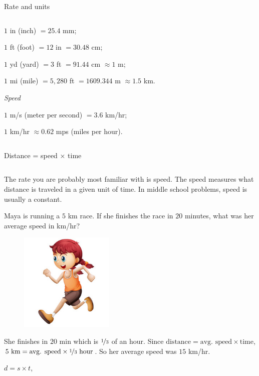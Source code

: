\documentclass[9pt,aspectratio=169]{beamer}
\begin{document}
\begin{frame}{Rate and units}
\begin{columns}[T]
\begin{column}{0.5\textwidth}
      $1$ in (inch) $= 25{.}4$ mm;

      $1$ ft (foot) $= 12$ in $= 30{.}48$ cm;

      $1$ yd (yard) $= 3$ ft $= 91{.}44$ cm $\approx 1$ m;

      $1$ mi (mile) $= 5{,}280$ ft $= 1609{.}344$ m $\approx 1{.}5$ km.\smallskip

      \emph{Speed}

      $1$ m/s (meter per second) $= 3{.}6$ km/hr;

      $1$ km/hr $\approx 0{.}62$ mps (miles per hour).
    \end{column}
  \end{columns}
\end{frame}

\begin{frame}{Distance = speed × time}
  \begin{columns}[T]
    \begin{column}{0.5\textwidth}
      The rate you are probably most familiar with is speed. The speed measures what distance is traveled in a given unit of time.  In middle school problems, speed is usually a constant.
      \begin{problem}
        Maya is running a $5$ km race.  If she finishes the race in $20$ minutes, what was her average speed in km/hr?
      \end{problem}
      \begin{figure}
        \vspace*{-1.3em}\hspace*{-2em}
        \includegraphics[width=0.4\textwidth]{09 - Rate/run.png}
      \end{figure}
      She finishes in $20$ min which is $\nicefrac{1}{3}$ of an hour.  Since $\text{distance} = \text{avg. speed} \times \text{time}$, $5\text{ km} = \text{avg. speed} \times \nicefrac{1}{3}\text{ hour}$. So her average speed was $15$ km/hr.
      \vspace*{2\baselineskip}
      \begin{definition}
        {\centering 
        $d = s \times t$,\par
        }
        

\end{definition}
\end{column}
\end{columns}
\end{frame}
\end{document}
